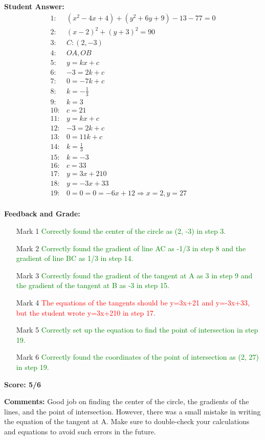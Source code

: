 \documentclass{article}
\begin{document}
\textbf{Student Answer:}
\begin{align*}
1: & (x^{2}-4x+4)+(y^{2}+6y+9)-13-77=0 \\
2: & (x-2)^{2}+(y+3)^{2}=90 \\
3: & C: (2, -3) \\
4: & OA, OB \\
5: & y=kx+c \\
6: & -3=2k+c \\
7: & 0=-7k+c \\
8: & k=-\frac{1}{3} \\
9: & k=3 \\
10: & c=21 \\
11: & y=kx+c \\
12: & -3=2k+c \\
13: & 0=11k+c \\
14: & k=\frac{1}{3} \\
15: & k=-3 \\
16: & c=33 \\
17: & y=3x+210 \\
18: & y=-3x+33 \\
19: & 0=0=0=-6x+12 \Rightarrow x=2,y=27 \\
\end{align*}

\textbf{Feedback and Grade:}
\begin{itemize}
\item[Mark 1] \textcolor{green}{Correctly found the center of the circle as (2, -3) in step 3.}
\item[Mark 2] \textcolor{green}{Correctly found the gradient of line AC as -1/3 in step 8 and the gradient of line BC as 1/3 in step 14.}
\item[Mark 3] \textcolor{green}{Correctly found the gradient of the tangent at A as 3 in step 9 and the gradient of the tangent at B as -3 in step 15.}
\item[Mark 4] \textcolor{red}{The equations of the tangents should be y=3x+21 and y=-3x+33, but the student wrote y=3x+210 in step 17.}
\item[Mark 5] \textcolor{green}{Correctly set up the equation to find the point of intersection in step 19.}
\item[Mark 6] \textcolor{green}{Correctly found the coordinates of the point of intersection as (2, 27) in step 19.}
\end{itemize}

\textbf{Score: 5/6}

\textbf{Comments:} Good job on finding the center of the circle, the gradients of the lines, and the point of intersection. However, there was a small mistake in writing the equation of the tangent at A. Make sure to double-check your calculations and equations to avoid such errors in the future.
\end{document}
